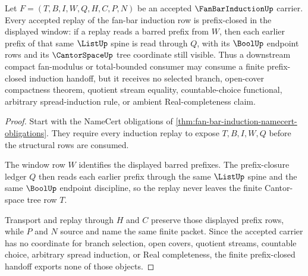 \begin{theorem}
\label{thm:fan-bar-induction-finite-prefix-closure}
Let $F=(T,B,I,W,Q,H,C,P,N)$ be an accepted $\FanBarInductionUp$ carrier. Every accepted replay of the fan-bar induction row is prefix-closed in the displayed window: if a replay reads a barred prefix from $W$, then each earlier prefix of that same $\ListUp$ spine is read through $Q$, with its $\BoolUp$ endpoint rows and its $\CantorSpaceUp$ tree coordinate still visible. Thus a downstream compact fan-modulus or total-bounded consumer may consume a finite prefix-closed induction handoff, but it receives no selected branch, open-cover compactness theorem, quotient stream equality, countable-choice functional, arbitrary spread-induction rule, or ambient Real-completeness claim.
\end{theorem}
\begin{proof}
Start with the NameCert obligations of \autoref{thm:fan-bar-induction-namecert-obligations}. They require every induction replay to expose $T,B,I,W,Q$ before the structural rows are consumed.

The window row $W$ identifies the displayed barred prefixes. The prefix-closure ledger $Q$ then reads each earlier prefix through the same $\ListUp$ spine and the same $\BoolUp$ endpoint discipline, so the replay never leaves the finite Cantor-space tree row $T$.

Transport and replay through $H$ and $C$ preserve those displayed prefix rows, while $P$ and $N$ source and name the same finite packet. Since the accepted carrier has no coordinate for branch selection, open covers, quotient streams, countable choice, arbitrary spread induction, or Real completeness, the finite prefix-closed handoff exports none of those objects.
\end{proof}



